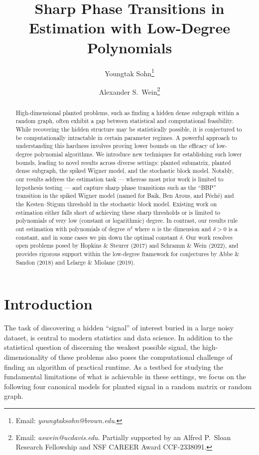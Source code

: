 \documentclass[11pt]{article}
\date{}
\title{Sharp Phase Transitions in Estimation with Low-Degree Polynomials}
\author[1]{Youngtak Sohn\thanks{Email: \textit{youngtak\textunderscore sohn@brown.edu}.}}
\author[2]{Alexander S.\ Wein\thanks{Email: \textit{aswein@ucdavis.edu}. Partially supported by an Alfred P.\ Sloan Research Fellowship and NSF CAREER Award CCF-2338091.}}
\affil[1]{Division of Applied Mathematics, Brown University}
\affil[2]{Department of Mathematics, UC Davis}
\begin{document}
\maketitle

\begin{abstract}

High-dimensional planted problems, such as finding a hidden dense subgraph within a random graph, often exhibit a gap between statistical and computational feasibility.  While recovering the hidden structure may be statistically possible, it is conjectured to be computationally intractable in certain parameter regimes.  A powerful approach to understanding this hardness involves proving lower bounds on the efficacy of low-degree polynomial algorithms.  We introduce new techniques for establishing such lower bounds, leading to novel results across diverse settings: planted submatrix, planted dense subgraph, the spiked Wigner model, and the stochastic block model. Notably, our results address the estimation task --- whereas most prior work is limited to hypothesis testing --- and capture sharp phase transitions such as the ``BBP'' transition in the spiked Wigner model (named for Baik, Ben Arous, and P\'{e}ch\'{e}) and the Kesten--Stigum threshold in the stochastic block model. Existing work on estimation either falls short of achieving these sharp thresholds or is limited to polynomials of very low (constant or logarithmic) degree. In contrast, our results rule out estimation with polynomials of degree $n^{\delta}$ where $n$ is the dimension and $\delta > 0$ is a constant, and in some cases we pin down the optimal constant $\delta$. Our work resolves open problems posed by Hopkins \& Steurer (2017) and Schramm \& Wein (2022), and  provides rigorous support within the low-degree framework for conjectures by Abbe \& Sandon (2018) and Lelarge \& Miolane (2019). 
\end{abstract}



\tableofcontents

\newpage

\section{Introduction}
\label{sec:intro}

The task of discovering a hidden ``signal'' of interest buried in a large noisy dataset, is central to modern statistics and data science. In addition to the statistical question of discerning the weakest possible signal, the high-dimensionality of these problems also poses the computational challenge of finding an algorithm of practical runtime. As a testbed for studying the fundamental limitations of what is achievable in these settings, we focus on the following four canonical models for planted signal in a random matrix or random graph.
\end{document}

